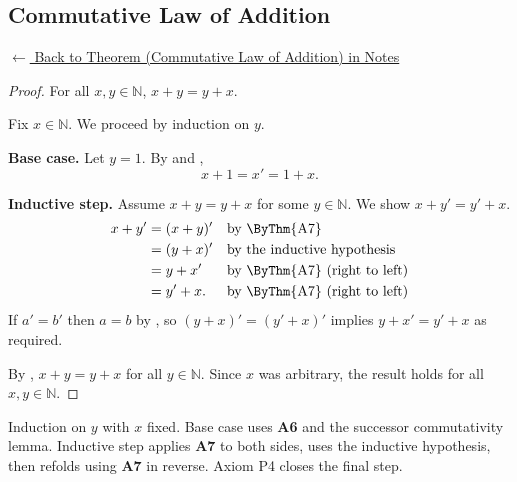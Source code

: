 
\subsection*{Commutative Law of Addition}
\label{prf:landau-plus-comm}

\begin{remark*}[Return]
\hyperref[thm:landau-plus-comm]{$\leftarrow$ Back to Theorem
(Commutative Law of Addition) in Notes}
\end{remark*}

\begin{proof}
\Claim For all $x, y \in \mathbb{N}$, $x + y = y + x$.

Fix $x \in \mathbb{N}$. We proceed by induction on $y$.

\textbf{Base case.} Let $y = 1$. By  and
,
\[
  x + 1 = x' = 1 + x.
\]

\textbf{Inductive step.} Assume $x + y = y + x$ for some $y \in \mathbb{N}$.
We show $x + y' = y' + x$.
\[
\begin{aligned}
  x + y'
    &= (x + y)'  && \text{by \ByThm{A7}} \\
    &= (y + x)'  && \text{by the inductive hypothesis} \\
    &= y + x'    && \text{by \ByThm{A7} (right to left)} \\
    &= y' + x.   && \text{by \ByThm{A7} (right to left)}
\end{aligned}
\]
If $a' = b'$ then $a = b$ by , so $(y + x)' = (y' + x)'$
implies $y + x' = y' + x$ as required.

By , $x + y = y + x$ for all $y \in \mathbb{N}$.
Since $x$ was arbitrary, the result holds for all $x, y \in \mathbb{N}$.
\end{proof}

\begin{remark*}
Induction on $y$ with $x$ fixed. Base case uses \textbf{A6} and the
successor commutativity lemma. Inductive step applies \textbf{A7} to both
sides, uses the inductive hypothesis, then refolds using \textbf{A7}
in reverse. Axiom P4 closes the final step.

\end{remark*}

